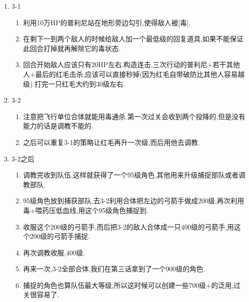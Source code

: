 	\begin{enumerate}
		\item{3-1}
			\begin{enumerate}
			\item 利用10万HP的普利尼站在地形旁边勾引,使得敌人被[毒].

			\item 在剩下一到两个敌人的时候给敌人加一个最低级的回复道具,如果不能保证此回合打掉就再解除它的毒状态.

			\item 回合开始敌人应该只有20HP左右,构造连击,三次行动的普利尼+若干其他人+最后的红毛击杀,应该可以直接秒掉(因为红毛自带破防比其他人容易越级).打完一只红毛大约到30级左右.
			\end{enumerate}

		\item{3-2}
			\begin{enumerate}
				\item 注意把飞行单位合体就能用毒通杀.第一次过关会收到两个投降的,但是没有能力的话是调教不能的.

				\item 之后可以重复3-1的策略让红毛再升一次级,而后用他去调教.

			\end{enumerate}
		
		\item{3-2之后}
			\begin{enumerate}

				\item 调教完收到队伍,这样就获得了一个95级角色,其他用来升级捕捉部队或者调教部队.

				\item 95级角色放到捕获部队,去3-2利用合体把左边的弓箭手做成200级,再次利用毒+喂药压低血线,用这个95级角色捕捉到.

				\item 收服这个200级的弓箭手,而后把3-2的敌人合体成一只400级的弓箭手,用这个200级的弓箭手捕捉.

				\item 再次调教收服,400级.

				\item 再来一次,3-2全部合体,我们在第三话拿到了一个900级的角色.

				\item 捕捉的角色也算队伍最大等级,所以这时候可以创建一些700级+的泛用,过关很容易了.

			\end{enumerate}				
	

		\end{enumerate}
	
